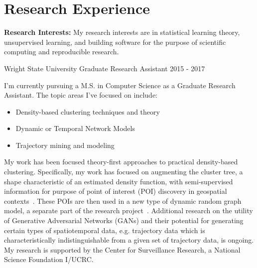 \documentclass[11pt,a4paper,sans]{moderncv} %
\begin{document}

%


\section{Research Experience}
\textbf{Research Interests: } My research interests are in statistical learning theory, unsupervised learning, and building software for the purpose of scientific computing and reproducible research.  
\newline 


			 {Wright State University}
			 {Graduate Research Assistant}
			 {2015 - 2017}{}
{  \vspace{3pt}
I'm currently pursuing a M.S. in Computer Science as a Graduate Research Assistant. The topic areas I've focused on include: 
	\begin{itemize}
		\item Density-based clustering techniques and theory 
		\item Dynamic or Temporal Network Models
		\item Trajectory mining and modeling
	\end{itemize}
My work has been focused theory-first approaches to practical density-based clustering. Specifically, my work has focused on augmenting the cluster tree, a shape characteristic of an estimated density function, with semi-supervised information for purpose of point of interest (POI) discovery in geospatial contexts~\cite{poi_paper}. These POIs are then used in a new type of dynamic random graph model, a separate part of the research project~\cite{robinson2017seasonality}. 
Additional research on the utility of Generative Adversarial Networks (GANs) and their potential for generating certain types of spatiotemporal data, e.g. trajectory data which is characteristically indistinguishable from a given set of trajectory data, is ongoing. 
My research is supported by the Center for Surveillance Research, a National Science Foundation I/UCRC.
}
\end{document}
